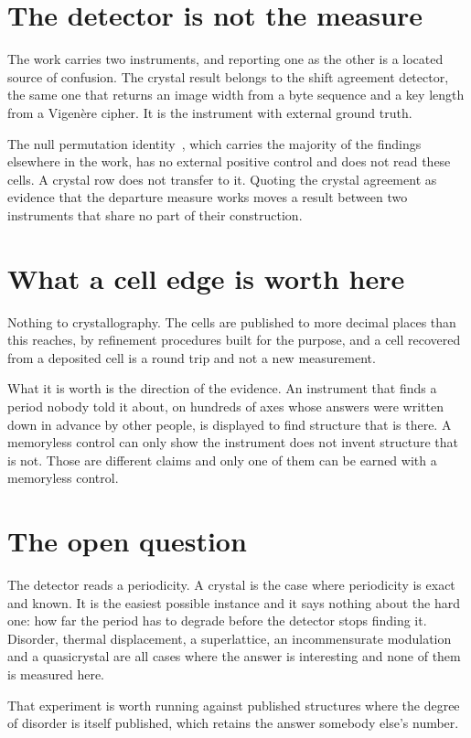\section{The detector is not the measure}

The work carries two instruments, and reporting one as the other is a located source of confusion. The crystal result belongs to the shift agreement detector, the same one that returns an image width from a byte sequence and a key length from a Vigenère cipher. It is the instrument with external ground truth.

The null permutation identity~\cite{src:Quigg-orior-workbook}, which carries the majority of the findings elsewhere in the work, has no external positive control and does not read these cells. A crystal row does not transfer to it. Quoting the crystal agreement as evidence that the departure measure works moves a result between two instruments that share no part of their construction.

\section{What a cell edge is worth here}

Nothing to crystallography. The cells are published to more decimal places than this reaches, by refinement procedures built for the purpose, and a cell recovered from a deposited cell is a round trip and not a new measurement.

What it is worth is the direction of the evidence. An instrument that finds a period nobody told it about, on hundreds of axes whose answers were written down in advance by other people, is displayed to find structure that is there. A memoryless control can only show the instrument does not invent structure that is not. Those are different claims and only one of them can be earned with a memoryless control.

\section{The open question}

The detector reads a periodicity. A crystal is the case where periodicity is exact and known. It is the easiest possible instance and it says nothing about the hard one: how far the period has to degrade before the detector stops finding it. Disorder, thermal displacement, a superlattice, an incommensurate modulation and a quasicrystal are all cases where the answer is interesting and none of them is measured here.

That experiment is worth running against published structures where the degree of disorder is itself published, which retains the answer somebody else's number.
